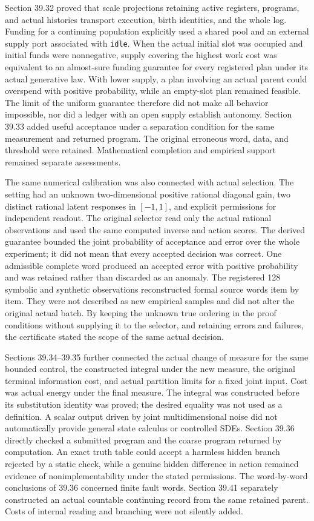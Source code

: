 \documentclass[
  english,
  11pt,
  oneside]{book}
\begin{document}
Section 39.32 proved that scale projections retaining active registers, programs, and actual histories transport execution, birth identities, and the whole log. Funding for a continuing population explicitly used a shared pool and an external supply port associated with \texttt{idle}. When the actual initial slot was occupied and initial funds were nonnegative, supply covering the highest work cost was equivalent to an almost-sure funding guarantee for every registered plan under its actual generative law. With lower supply, a plan involving an actual parent could overspend with positive probability, while an empty-slot plan remained feasible. The limit of the uniform guarantee therefore did not make all behavior impossible, nor did a ledger with an open supply establish autonomy. Section 39.33 added useful acceptance under a separation condition for the same measurement and returned program. The original erroneous word, data, and threshold were retained. Mathematical completion and empirical support remained separate assessments.

The same numerical calibration was also connected with actual selection. The setting had an unknown two-dimensional positive rational diagonal gain, two distinct rational latent responses in \([-1,1]\), and explicit permissions for independent readout. The original selector read only the actual rational observations and used the same computed inverse and action scores. The derived guarantee bounded the joint probability of acceptance and error over the whole experiment; it did not mean that every accepted decision was correct. One admissible complete word produced an accepted error with positive probability and was retained rather than discarded as an anomaly. The registered 128 symbolic and synthetic observations reconstructed formal source words item by item. They were not described as new empirical samples and did not alter the original actual batch. By keeping the unknown true ordering in the proof conditions without supplying it to the selector, and retaining errors and failures, the certificate stated the scope of the same actual decision.

Sections 39.34--39.35 further connected the actual change of measure for the same bounded control, the constructed integral under the new measure, the original terminal information cost, and actual partition limits for a fixed joint input. Cost was actual energy under the final measure. The integral was constructed before its substitution identity was proved; the desired equality was not used as a definition. A scalar output driven by joint multidimensional noise did not automatically provide general state calculus or controlled SDEs. Section 39.36 directly checked a submitted program and the coarse program returned by computation. An exact truth table could accept a harmless hidden branch rejected by a static check, while a genuine hidden difference in action remained evidence of nonimplementability under the stated permissions. The word-by-word conclusions of 39.36 concerned finite fault words. Section 39.41 separately constructed an actual countable continuing record from the same retained parent. Costs of internal reading and branching were not silently added.
\end{document}
